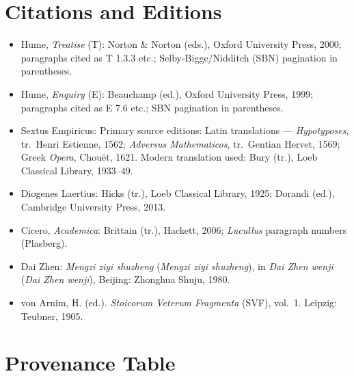 \documentclass[11pt]{article}
\theoremstyle{plain}
\theoremstyle{definition}
\theoremstyle{remark}
\begin{document}
\section*{Citations and Editions}

\begin{itemize}
\item Hume, \emph{Treatise} (T): Norton \& Norton (eds.), Oxford
University Press, 2000; paragraphs cited as T 1.3.3 etc.;
Selby-Bigge/Nidditch (SBN) pagination in parentheses.
\item Hume, \emph{Enquiry} (E): Beauchamp (ed.), Oxford University
Press, 1999; paragraphs cited as E 7.6 etc.; SBN pagination in
parentheses.
\item Sextus Empiricus: Primary source editions: Latin translations
--- \emph{Hypotyposes}, tr.\ Henri Estienne, 1562;
\emph{Adversus Mathematicos}, tr.\ Gentian Hervet, 1569; Greek
\emph{Opera}, Chou\"et, 1621. Modern translation used: Bury (tr.), Loeb Classical
Library, 1933--49.
\item Diogenes Laertius: Hicks (tr.), Loeb Classical Library, 1925;
Dorandi (ed.), Cambridge University Press, 2013.
\item Cicero, \emph{Academica}: Brittain (tr.), Hackett, 2006;
\emph{Lucullus} paragraph numbers (Plasberg).
\item Dai Zhen: \emph{Mengzi ziyi shuzheng} (\emph{Men\-gzi zi\-yi
shu\-zheng}), in \emph{Dai Zhen wenji} (\emph{Dai Zhen wen\-ji}),
Beijing: Zhonghua Shuju, 1980.
\item von Arnim, H. (ed.). \emph{Stoicorum Veterum Fragmenta} (SVF),
vol.~1. Leipzig: Teubner, 1905.
\end{itemize}

\section*{Provenance Table}
\end{document}
